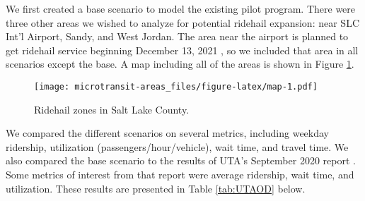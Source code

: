 \documentclass[3p, authoryear]{elsarticle} %
\begin{document}
We first created a base scenario to model the existing pilot program. There were three other areas we wished to analyze for potential ridehail expansion: near SLC Int'l Airport, Sandy, and West Jordan. The area near the airport is planned to get ridehail service beginning December 13, 2021 \citep{Airport}, so we included that area in all scenarios except the base. A map including all of the areas is shown in Figure \ref{fig:map}.

\begin{figure}
\centering
\texttt{[image: microtransit-areas\_files/figure-latex/map-1.pdf]}
\caption{\label{fig:map}Ridehail zones in Salt Lake County.}
\end{figure}

We compared the different scenarios on several metrics, including weekday ridership, utilization (passengers/hour/vehicle), wait time, and travel time. We also compared the base scenario to the results of UTA's September 2020 report \citep{UTAreport}. Some metrics of interest from that report were average ridership, wait time, and utilization. These results are presented in Table \ref{tab:UTAOD} below.
\end{document}
